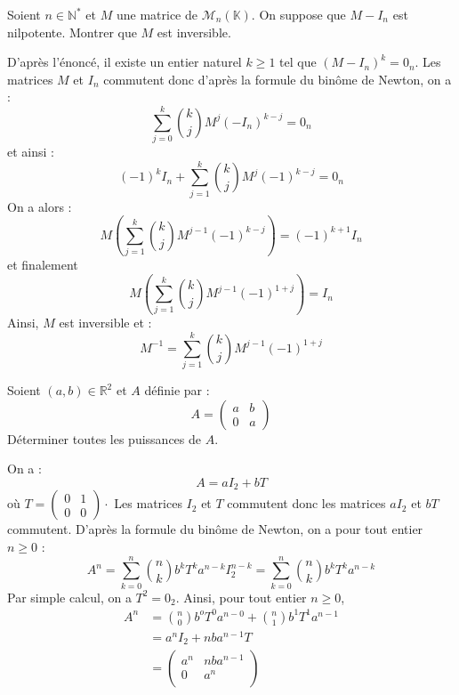 \documentclass[a4paper,10pt]{report}
\begin{document}
\begin{Exercice}{} Soient $n \in \mathbb{N}^*$ et $M$ une matrice de $\mathcal{M}_n(\mathbb{K})$. On suppose que $M-I_n$ est nilpotente. Montrer que $M$ est inversible.
\end{Exercice} 

\corr D'après l'énoncé, il existe un entier naturel $k \geq 1$ tel que $(M-I_n)^k = 0_n$. Les matrices $M$ et $I_n$ commutent donc d'après la formule du binôme de Newton, on a :
$$ \sum_{j=0}^k \binom{k}{j} M^j (-I_n)^{k-j} = 0_n$$
et ainsi :
$$ (-1)^k I_n + \sum_{j=1}^k \binom{k}{j} M^j (-1)^{k-j} = 0_n$$
On a alors :
$$ M \left(\sum_{j=1}^k \binom{k}{j} M^{j-1} (-1)^{k-j} \right) = (-1)^{k+1} I_n$$
et finalement 
$$ M \left(\sum_{j=1}^k \binom{k}{j} M^{j-1} (-1)^{1+j} \right)= I_n$$
Ainsi, $M$ est inversible et :
$$ M^{-1} = \sum_{j=1}^k \binom{k}{j} M^{j-1} (-1)^{1+j} $$

\medskip

\begin{Exercice}{} Soient $(a,b) \in \mathbb{R}^2$ et $A$ définie par :
$$ A = \begin{pmatrix}
a & b \\
0  & a
\end{pmatrix}$$ 
Déterminer toutes les puissances de $A$.
\end{Exercice}

\corr On a :
$$ A = a I_2 + b T$$
où $T = \begin{pmatrix}
0 & 1 \\
0 & 0
\end{pmatrix} \cdot$ Les matrices $I_2$ et $T$ commutent donc les matrices $a I_2$ et $bT$ commutent. D'après la formule du binôme de Newton, on a pour tout entier $n \geq 0$ :
$$ A^n = \sum_{k=0}^n \binom{n}{k} b^k T^k a^{n-k} I_2^{n-k} = \sum_{k=0}^n \binom{n}{k} b^k T^k a^{n-k} $$
Par simple calcul, on a $T^2 = 0_2$. Ainsi, pour tout entier $n \geq 0$,
\begin{align*}
 A^n  &= \binom{n}{0} b^o T^0 a^{n-0} + \binom{n}{1} b^1 T^1 a^{n-1} \\
 & = a^n I_2 + nba^{n-1} T \\
 & = \begin{pmatrix}
 a^n & nba^{n-1} \\
 0 & a^n \\
 \end{pmatrix}
 \end{align*}
%
%
\end{document}
